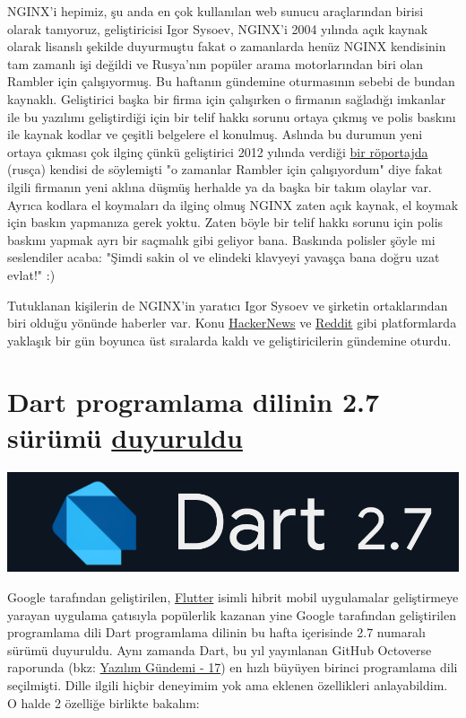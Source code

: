 \documentclass[11pt]{article}
\begin{document}
NGINX'i hepimiz, şu anda en çok kullanılan web sunucu araçlarından birisi
olarak tanıyoruz, geliştiricisi Igor Sysoev, NGINX'i 2004 yılında açık kaynak
olarak lisanslı şekilde duyurmuştu fakat o zamanlarda henüz NGINX kendisinin
tam zamanlı işi değildi ve Rusya'nın popüler arama motorlarından biri olan
Rambler için çalışıyormuş. Bu haftanın gündemine oturmasının sebebi de bundan
kaynaklı. Geliştirici başka bir firma için çalışırken o firmanın sağladığı
imkanlar ile bu yazılımı geliştirdiği için bir telif hakkı sorunu ortaya çıkmış
ve polis baskını ile kaynak kodlar ve çeşitli belgelere el konulmuş. Aslında bu
durumun yeni ortaya çıkması çok ilginç çünkü geliştirici 2012 yılında verdiği
\href{https://habr.com/ru/company/xakep/blog/136354/}{bir röportajda} (rusça) kendisi de söylemişti "o zamanlar Rambler için
çalışıyordum" diye fakat ilgili firmanın yeni aklına düşmüş herhalde ya da
başka bir takım olaylar var. Ayrıca kodlara el koymaları da ilginç olmuş NGINX
zaten açık kaynak, el koymak için baskın yapmanıza gerek yoktu. Zaten böyle bir
telif hakkı sorunu için polis baskını yapmak ayrı bir saçmalık gibi geliyor
bana. Baskında polisler şöyle mi seslendiler acaba: "Şimdi sakin ol ve elindeki
klavyeyi yavaşça bana doğru uzat evlat!" :)

Tutuklanan kişilerin de NGINX'in yaratıcı Igor Sysoev ve şirketin ortaklarından
biri olduğu yönünde haberler var. Konu \href{https://news.ycombinator.com/item?id=21771144}{HackerNews} ve \href{https://www.reddit.com/r/linux/comments/e9oub4/sorry\_cannot\_find\_good\_related\_subreddits\_to/}{Reddit} gibi platformlarda
yaklaşık bir gün boyunca üst sıralarda kaldı ve geliştiricilerin gündemine
oturdu.
\section{Dart programlama dilinin 2.7 sürümü \href{https://medium.com/dartlang/dart-2-7-a3710ec54e97}{duyuruldu}}
\label{sec:org3fd6f6e}
\begin{center}
\includegraphics[width=.9\linewidth]{gorseller/dart-2-7.png}
\end{center}

Google tarafından geliştirilen, \href{https://github.com/flutter/flutter}{Flutter} isimli hibrit mobil uygulamalar
geliştirmeye yarayan uygulama çatısıyla popülerlik kazanan yine Google
tarafından geliştirilen programlama dili Dart programlama dilinin bu hafta
içerisinde 2.7 numaralı sürümü duyuruldu. Aynı zamanda Dart, bu yıl yayınlanan
GitHub Octoverse raporunda (bkz: \href{../17/yazilim-gundemi-17.pdf}{Yazılım Gündemi - 17}) en hızlı büyüyen birinci
programlama dili seçilmişti. Dille ilgili hiçbir deneyimim yok ama eklenen
özellikleri anlayabildim. O halde 2 özelliğe birlikte bakalım:
\end{document}
